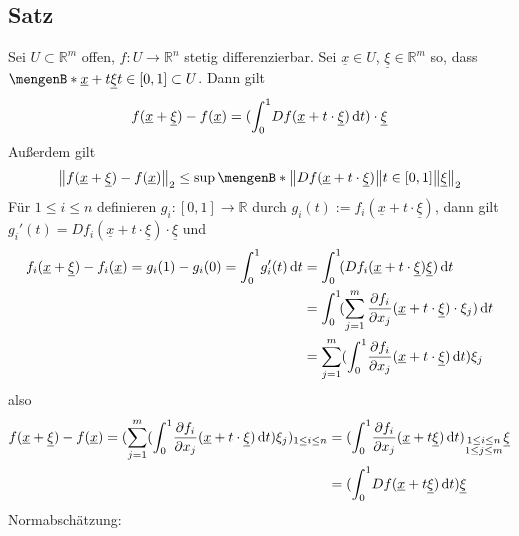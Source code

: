 \subsection[Satz: Mittelwertsatz für vektorwertige Funktionen mehrerer Variablen]{Satz} %
\label{sub:711}
Sei $U \subset \mathds{R}^m$ offen, $f : U \to \mathds{R}^n$ stetig differenzierbar. Sei $\underline{x} \in U$, $\underline{\xi} \in \mathds{R}^m$ so, dass 
$\set[\underline{x} + t \underline{\xi}]{t \in [0,1]} \subset U $. Dann gilt 
\[
	f (\underline{x} + \underline{\xi}) - f(\underline{x}) =  (\int_{0} ^{1} \! D f (\underline{x}+t  \cdot \underline{\xi}) \,\mathrm{d}t) 
	\cdot \underline{\xi}
\]
Außerdem gilt 
\[
	\norm[2]{f( \underline{x} + \underline{\xi}) -f (\underline{x})} \le \sup \set[{\norm{D f( \underline{x} + t \cdot \underline{\xi})}}]{t \in [0,1]} 	\norm[2]{\underline{\xi}}   
\]
Für $1 \le i \le n$ definieren $g_i : [0,1] \to \mathds{R}$ durch $g_i(t) := f_i ( \underline{x} + t \cdot \underline{\xi})$, dann gilt 
$g_i '(t) = D f_i ( \underline{x} + t \cdot \underline{\xi}) \cdot \underline{\xi}$ und 
\begin{align*}
	f_i(\underline{x} + \underline{\xi}) - f_i(\underline{x}) = g_i (1) - g_i(0) = \int_{0} ^{1} \! g_i'(t)  \, \mathrm{d}t &= \int_{0} ^{1} \! (D f_i (\underline{x} + t \cdot \underline{\xi}) \underline{\xi})  \, \mathrm{d}t \\
	&= \int_{0} ^{1} \! (\sum_{j=1}^{m} \frac{{\partial f_i}}{{\partial x_j}}  ( \underline{x} + t \cdot \underline{\xi}) \cdot \xi_j)  \, \mathrm{d}t \\
	&= \sum_{j=1}^{m} (\int_{0} ^{1} \! \frac{{\partial f_i}}{{\partial x_j}}  ( \underline{x} + t \cdot \underline{\xi})  \, \mathrm{d}t) \xi_j
\end{align*}
also
\begin{align*}
	f(\underline{x} + \underline{\xi}) - f(\underline{x}) = (\sum_{j=1}^{m} (\int_{0} ^{1} \! \frac{{\partial f_i}}{{\partial x_j}}  ( \underline{x} + t \cdot \underline{\xi})  \, \mathrm{d}t) \xi_j )_{1 \le i \le n} &= (\int_{0} ^{1} \! \frac{{\partial f_i}}{{\partial x_j}}  (\underline{x} + t \underline{\xi})  \, \mathrm{d}t)_{\substack{1 \le i \le n \\
	1 \le j \le m}} \underline{\xi} \\
	&= (\int_{0} ^{1} \!  D f( \underline{x} + t \underline{\xi})  \, \mathrm{d}t) \underline{\xi}
\end{align*}
Normabschätzung: 
